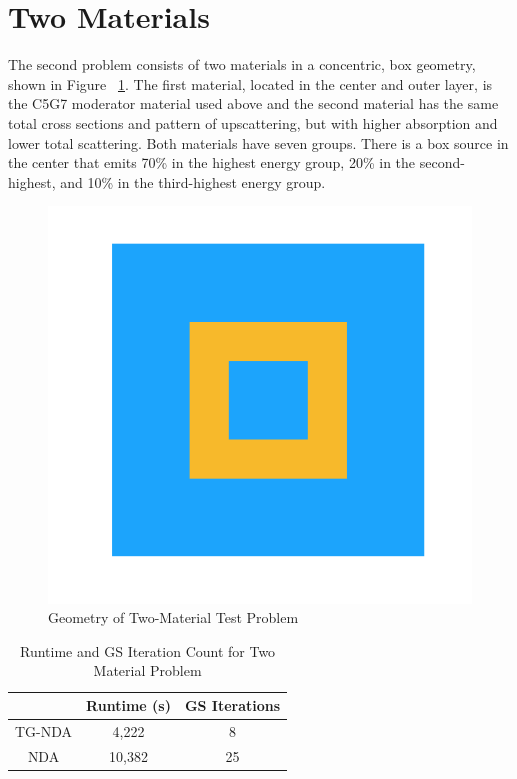 \section{Two Materials}
The second problem consists of two materials in a concentric, box geometry, shown in Figure ~\ref{fig:test_geometry}. 
The first material, located in the center and outer layer, is the C5G7 moderator material used above and the second material has the same total cross sections and pattern of upscattering, but with higher absorption and lower total scattering. Both materials have seven groups. 
There is a box source in the center that emits 70\% in the highest energy group, 20\% in the second-highest, and 10\% in the third-highest energy group.
\begin{figure}[H]
    \centering
    \includegraphics[width=.3\textwidth]{fig/Geometry.png}
    \caption{Geometry of Two-Material Test Problem}
    \label{fig:test_geometry}
\end{figure}

\begin{table}[!htb]
\centering
\caption{Runtime and GS Iteration Count for Two Material Problem}
    \label{tab:two}
\begin{center}
    \begin{tabular}{|c|c|c|}
    \hline
    & Runtime (s) & GS Iterations \\
    \hline
    TG-NDA & 4,222 & 8 \\
    NDA & 10,382 & 25 \\
    \hline
    \end{tabular}
\end{center}
\end{table}

